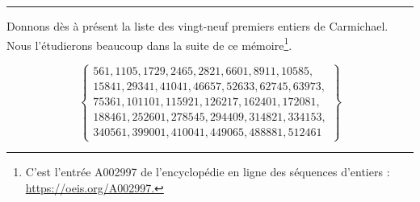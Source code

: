 \begin{adjustwidth}{1cm}{1cm}
	\begin{center}
		\vspace{1cm}
		\rule{11cm}{0.5pt}
		\vspace{1cm}

		Donnons dès à présent la liste des vingt-neuf premiers entiers de Carmichael. Nous l'étudierons beaucoup dans la suite de ce mémoire\footnote{C’est l'entrée A002997 de l'encyclopédie en ligne des séquences d’entiers : \url{https://oeis.org/A002997.}}.

		\begin{equation}\label{liste-carmichael}
			\begin{Bmatrix}
				561,1105,1729,2465,2821,6601,8911,10585, \\
				15841, 29341, 41041, 46657, 52633, 62745, 63973, \\
				75361, 101101, 115921, 126217, 162401, 172081, \\
				188461, 252601, 278545, 294409, 314821, 334153, \\
				340561, 399001, 410041, 449065, 488881, 512461
			\end{Bmatrix}
		\end{equation}
		\vspace{1em}
	\end{center}
\end{adjustwidth}


